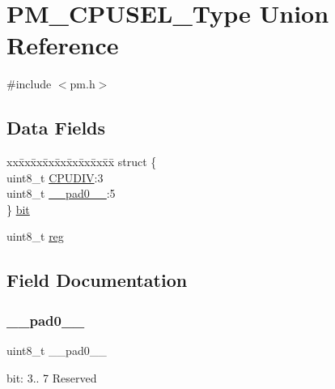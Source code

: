 \hypertarget{union_p_m___c_p_u_s_e_l___type}{}\section{P\+M\+\_\+\+C\+P\+U\+S\+E\+L\+\_\+\+Type Union Reference}
\label{union_p_m___c_p_u_s_e_l___type}


{\ttfamily \#include $<$pm.\+h$>$}

\subsection*{Data Fields}
\begin{DoxyCompactItemize}
\item 
\begin{tabbing}
xx\=xx\=xx\=xx\=xx\=xx\=xx\=xx\=xx\=\kill
struct \{\\
\>uint8\_t \mbox{\hyperlink{union_p_m___c_p_u_s_e_l___type_a285712acd136d7f8257dece3a78fbb51}{CPUDIV}}:3\\
\>uint8\_t \mbox{\hyperlink{union_p_m___c_p_u_s_e_l___type_a8b4eebe79ded0459acec2f4950102ba3}{\_\_pad0\_\_}}:5\\
\} \mbox{\hyperlink{union_p_m___c_p_u_s_e_l___type_ab220bef40fefa7e06f59247a63a143af}{bit}}\\

\end{tabbing}\item 
uint8\+\_\+t \mbox{\hyperlink{union_p_m___c_p_u_s_e_l___type_a9428adc9af4653a2050e2536b55dec8d}{reg}}
\end{DoxyCompactItemize}


\subsection{Field Documentation}
\mbox{\label{union_p_m___c_p_u_s_e_l___type_a8b4eebe79ded0459acec2f4950102ba3}} 
\subsubsection{\texorpdfstring{\_\_pad0\_\_}{\_\_pad0\_\_}}
{\footnotesize\ttfamily uint8\+\_\+t \+\_\+\+\_\+pad0\+\_\+\+\_\+}

bit\+: 3.. 7 Reserved \mbox{\label{union_p_m___c_p_u_s_e_l___type_ab220bef40fefa7e06f59247a63a143af}} 

